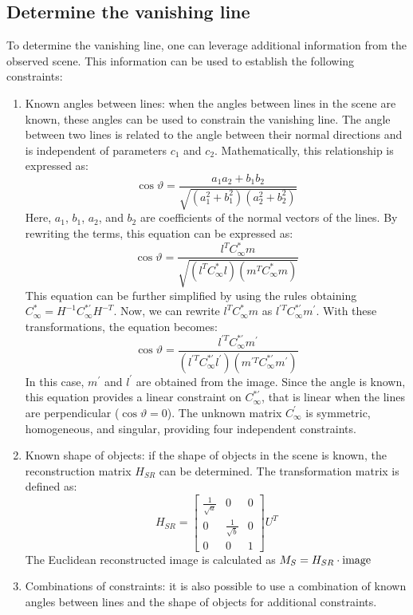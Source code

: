 \subsection{Determine the vanishing line}
To determine the vanishing line, one can leverage additional information from the observed scene. 
This information can be used to establish the following constraints:
\begin{enumerate}
    \item Known angles between lines: when the angles between lines in the scene are known, these angles can be used to constrain the vanishing line. 
        The angle between two lines is related to the angle between their normal directions and is independent of parameters $c_1$ and $c_2$. 
        Mathematically, this relationship is expressed as:
        \[\cos\vartheta=\dfrac{a_1a_2+b_1b_2}{\sqrt{(a_1^2+b_1^2)(a_2^2+b_2^2)}}\]
        Here, $a_1$, $b_1$, $a_2$, and $b_2$ are coefficients of the normal vectors of the lines. 
        By rewriting the terms, this equation can be expressed as: 
        \[\cos\vartheta=\dfrac{l^TC_{\infty}^{*}m}{\sqrt{(l^TC_{\infty}^{*}l)(m^TC_{\infty}^{*}m)}}\]
        This equation can be further simplified by using the rules obtaining $C_{\infty}^{*}=H^{-1}C_{\infty}^{*'}H^{-T}$.  
        Now, we can rewrite $l^TC_{\infty}^{*}m$ as $l^{'T}C_{\infty}^{*'}m^{'}$. 
        With these transformations, the equation becomes:
        \[\cos\vartheta=\dfrac{l^{'T}C_{\infty}^{*'}m^{'}}{(l^{'T}C_{\infty}^{*'}l^{'})(m^{'T}C_{\infty}^{*'}m^{'})}\]
        In this case, $m^{'}$ and $l^{'}$ are obtained from the image. 
        Since the angle is known, this equation provides a linear constraint on $C_{\infty}^{*'}$, that is linear when the lines are perpendicular ($\cos\vartheta=0$).
        The unknown matrix $C_{\infty}^{'}$ is symmetric, homogeneous, and singular, providing four independent constraints.
    \item Known shape of objects: if the shape of objects in the scene is known, the reconstruction matrix $H_{SR}$ can be determined. 
        The transformation matrix is defined as:
        \[H_{SR}=
        \begin{bmatrix}
            \frac{1}{\sqrt{a}} & 0 & 0 \\
            0 & \frac{1}{\sqrt{b}} & 0 \\
            0 & 0 & 1
        \end{bmatrix}
        U^T
        \]
        The Euclidean reconstructed image is calculated as $M_S=H_{SR} \cdot \textnormal{image}$
    \item Combinations of constraints: it is also possible to use a combination of known angles between lines and the shape of objects for additional constraints.

\end{enumerate}
